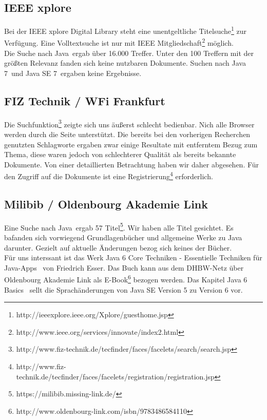\subsection{IEEE xplore}
Bei der IEEE xplore Digital Library steht eine unentgeltliche Titelsuche\footnote{http://ieeexplore.ieee.org/Xplore/guesthome.jsp} zur Verfügung. Eine Volltextsuche ist nur mit IEEE Mitgliedschaft\footnote{http://www.ieee.org/services/innovate/index2.html} möglich.\\

Die Suche nach \glqq Java\grqq ~ergab über 16.000 Treffer. Unter den 100 Treffern mit der größten Relevanz fanden sich keine nutzbaren Dokumente. Suchen nach \glqq Java 7\grqq ~und \glqq Java SE 7\grqq ~ergaben keine Ergebnisse.

\subsection{FIZ Technik / WFi Frankfurt}
Die Suchfunktion\footnote{http://www.fiz-technik.de/tecfinder/faces/facelets/search/search.jsp} zeigte sich uns äußerst schlecht bedienbar. Nich alle Browser werden durch die Seite unterstützt. Die bereits bei den vorherigen Recherchen genutzten Schlagworte ergaben zwar einige Resultate mit entferntem Bezug zum Thema, diese waren jedoch von schlechterer Qualität als bereits bekannte Dokumente. Von einer detaillierten Betrachtung haben wir daher abgesehen.
Für den Zugriff auf die Dokumente ist eine Registrierung\footnote{http://www.fiz-technik.de/tecfinder/faces/facelets/registration/registration.jsp} erforderlich.

\subsection{Milibib / Oldenbourg Akademie Link}
Eine Suche nach \glqq Java\grqq ~ergab 57 Titel\footnote{https://milibib.missing-link.de/}. Wir haben alle Titel gesichtet. Es bafanden sich vorwiegend Grundlagenbücher und allgemeine Werke zu Java darunter. Gezielt auf aktuelle Änderungen bezog sich keines der Bücher.\\

Für uns interssant ist das Werk \glqq Java 6 Core Techniken - Essentielle Techniken für Java-Apps\grqq\cite{java6core} ~von Friedrich Esser. Das Buch kann aus dem DHBW-Netz über Oldenbourg Akademie Link als E-Book\footnote{http://www.oldenbourg-link.com/isbn/9783486584110} bezogen werden. Das Kapitel \glqq Java 6 Basics\grqq\cite{java6core} ~sellt die Sprachänderungen von Java SE Version 5 zu Version 6 vor.

